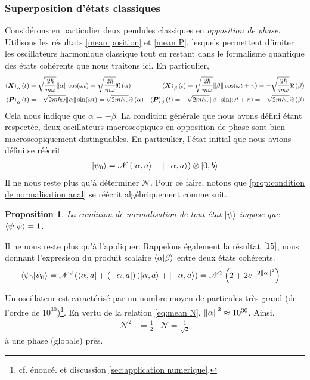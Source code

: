 \documentclass[11pt,oneside,a4paper]{article}
\newcommand{\h}{\ensuremath{\hbar}}
\newtheorem{property}[theorem]{Proposition}
\begin{document}
\subsubsection{Superposition d'états classiques}
Considérons en particulier deux pendules classiques en \emph{opposition de phase}. Utilisons les résultats \eqref{mean position} et \eqref{mean P}, lesquels permettent d'imiter les oscillateurs harmonique classique tout en restant dans le formalisme quantique des états cohérents que nous traitons ici. En particulier,
\begin{align*}
  \expval{\bm{X}}_\alpha (t) &= \sqrt{\frac{2\h}{m\omega}}\norm{\alpha}\cos(\omega t) = \sqrt{\frac{2\h}{m\omega}}\real \left(\alpha\right)&\expval{\bm{X}}_\beta (t) = \sqrt{\frac{2\h}{m\omega}}\norm{\beta}\cos(\omega t+\pi)=-\sqrt{\frac{2\h}{m\omega}}\real \left(\beta\right)\\
  \expval{\bm{P}}_\alpha (t) &= -\sqrt{2m\h\omega}\norm{\alpha}\sin(\omega t)=\sqrt{2m\h\omega}\imaginary \left(\alpha\right) &\expval{\bm{P}}_\beta (t) = -\sqrt{2m\h\omega}\norm{\beta}\sin(\omega t+\pi) = -\sqrt{2m\h\omega}\imaginary\left(\beta\right)
\end{align*}
Cela nous indique que $\alpha=-\beta$. La condition générale que nous avons défini étant respectée, deux oscillateurs macroscopiques en opposition de phase sont bien macroscopiquement distinguables. En particulier, l'état initial que nous avions défini se réécrit
\begin{align*}
  \ket{\psi_0} = \mathcal{N}\left(\ket{\alpha,a}+\ket{-\alpha,a}\right)\otimes\ket{0,b}
\end{align*}
Il ne nous reste plus qu'à déterminer $\mathcal{N}$. Pour ce faire, notons que \ref{prop:condition de normalisation anal} se réécrit algébriquement comme suit.
\begin{property}
  La condition de normalisation de tout état $\ket{\psi}$ impose que $\braket{\psi} = 1$.
\end{property}

Il ne nous reste plus qu'à l'appliquer. Rappelons également la résultat $\eqref{15}$, nous donnant l'expresison du produit scalaire $\braket{\alpha}{\beta}$ entre deux états cohérents.
\begin{align*}
  \braket{\psi_0} &= \mathcal{N}^2\left(\bra{\alpha,a}+\bra{-\alpha,a}\right)\left(\ket{\alpha,a}+\ket{-\alpha,a}\right) = \mathcal{N}^2\left(2+2e^{-2\norm{\alpha}^2}\right)
\end{align*}

Un oscillateur est caractérisé par un nombre moyen de particules très grand (de l'ordre de $10^{30}$)\footnote{cf. énoncé. et discussion \ref{sec:application numerique}.}. En vertu de la relation \eqref{eq:mean N}, $\norm{\alpha}^2 \approx 10^{30}$. Ainsi, 
\begin{align}
  \mathcal{N}^2 &= \frac{1}{2} &\mathcal{N} = \frac{1}{\sqrt{2}}
\end{align} 
à une phase (globale) près.
\end{document}

